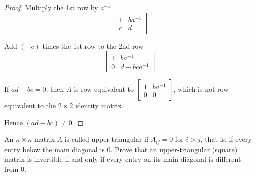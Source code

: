 \begin{proof}
    Multiply the 1st row by $a^{-1}$
    \[
        \begin{bmatrix}
            1 & ba^{-1} \\
            c & d
        \end{bmatrix}
    \]

    Add $(-c)$ times the 1st row to the 2nd row
    \[
        \begin{bmatrix}
            1 & ba^{-1}      \\
            0 & d - bca^{-1}
        \end{bmatrix}
    \]

    If $ad - bc = 0$, then $A$ is row-equivalent to $\begin{bmatrix}1 & ba^{-1} \\ 0 & 0\end{bmatrix}$, which is not row-equivalent to the $2\times 2$ identity matrix.

    Hence $(ad - bc)\ne 0$.
\end{proof}

\begin{exercise}
    An $n\times n$ matrix $A$ is called upper-triangular if $A_{ij} = 0$ for $i > j$, that is, if every entry below the main diagonal is $0$. Prove that an upper-triangular (square) matrix is invertible if and only if every entry on its main diagonal is different from $0$.
\end{exercise}

